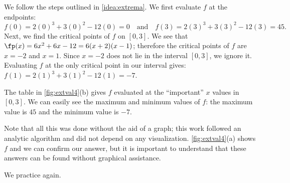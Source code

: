 {We follow the steps outlined in \autoref{idea:extrema}. We first evaluate $f$ at the endpoints:
\[f(0)=2(0)^3+3(0)^2-12(0) = 0 \quad \text{and}\quad f(3)=2(3)^3+3(3)^2-12(3) =45.\]
Next, we find the critical points of $f$ on $[0,3]$. We see that $\fp(x) = 6x^2+6x-12 = 6(x+2)(x-1)$; therefore the critical points of $f$ are $x=-2$ and $x=1$. Since $x=-2$ does not lie in the interval $[0,3]$, we ignore it. Evaluating $f$ at the only critical point in our interval gives: $f(1)=2(1)^3+3(1)^2-12(1) = -7$. 


The table in \autoref{fig:extval4}(b) gives $f$ evaluated at the ``important'' $x$ values in $[0,3]$. We can easily see the maximum and minimum values of $f$: the maximum value is $45$ and the minimum value is $-7$.}

Note that all this was done without the aid of a graph; this work followed an analytic algorithm and did not depend on any visualization. \autoref{fig:extval4}(a) shows $f$ and we can confirm our answer, but it is important to  understand that these answers can be found without graphical assistance.

We practice again.

